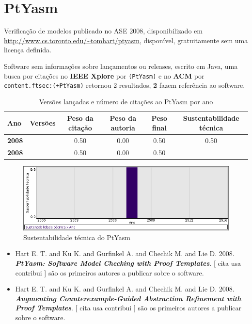 \section{PtYasm}

Verificação de modelos
publicado no ASE 2008,
disponibilizado em \url{http://www.cs.toronto.edu/~tomhart/ptyasm},
disponível,
gratuitamente
sem uma licença definida.

Software sem informações sobre lançamentos ou releases,
escrito em Java,
uma busca por citações no {\bf IEEE Xplore} por
\texttt{(PtYasm)}
e no {\bf ACM} por
\texttt{content.ftsec:(+PtYasm)}
retornou
2 resultados,
{\bf 2} fazem referência ao software.


\begin{table}[H]
\caption{Versões lançadas e número de citações ao PtYasm por ano}
\centering
\begin{tabular}{| l | c | c | c | c | c |}
  \hline
  Ano & Versões & Peso da citação & Peso da autoria & Peso final & Sustentabilidade técnica \\
  \hline
            {\bf 2008}
          &
          
          &
          0.50
          &
          0.00
          &
          0.50
          &
            {\color{blue} 0.50}
          \\
            {\bf 2008}
          &
          
          &
          0.50
          &
          0.00
          &
          0.50
          &
          \\
\hline
\end{tabular}
\end{table}

\begin{figure}[h]
  \center
  \includegraphics[scale=0.50]{result-documents/charts/ptyasm.png}
  \caption{Sustentabilidade técnica do PtYasm}
\end{figure}


\begin{itemize}
\item Hart E. T. and Ku K. and Gurfinkel A. and Chechik M. and Lie D.
      2008.
        \textbf{\textit{ PtYasm: Software Model Checking with Proof Templates}}.
      [
          cita
          usa
          contribui
      ]
são os primeiros autores a publicar sobre o software.
\item Hart E. T. and Ku K. and Gurfinkel A. and Chechik M. and Lie D.
      2008.
        \textbf{\textit{ Augmenting Counterexample-Guided Abstraction Refinement with Proof Templates}}.
      [
          cita
          usa
          contribui
      ]
são os primeiros autores a publicar sobre o software.
\end{itemize}
